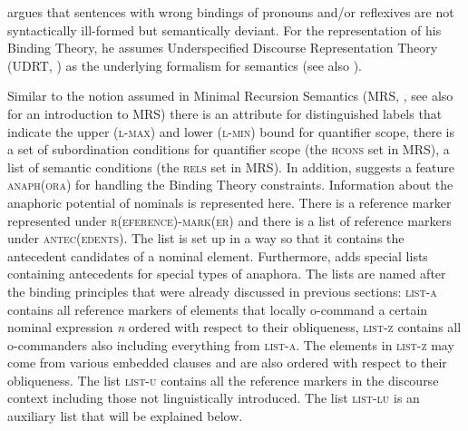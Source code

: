 \documentclass[output=paper
 	        ,biblatex
                ,babelshorthands
                ,newtxmath
                ,draftmode
                ,colorlinks, citecolor=brown
]{langscibook}
\begin{document}
\citet{Branco2002a} argues that sentences with wrong bindings of pronouns and/or reflexives are not
syntactically ill-formed but semantically deviant. For the representation of his Binding Theory, he
assumes Underspecified Discourse Representation Theory (UDRT, \citealp{Reyle93b-u,FR95a-u}) as the
underlying formalism for semantics (see also
). 

Similar to the notion assumed in Minimal Recursion Semantics (MRS, \citealp*{CFPS2005a}, see also  for an introduction to MRS) there is an
attribute for distinguished labels that indicate the upper (\textsc{l-max}) and lower
(\textsc{l-min}) bound for quantifier scope, there is a set of subordination conditions for
quantifier scope (the \textsc{hcons} set in MRS), a list of semantic conditions (the \textsc{rels}
set in MRS). In addition, \citeauthor{Branco2002a} suggests a feature \textsc{anaph(ora)} for handling
the Binding Theory constraints. Information about the anaphoric potential of nominals is represented
here. There is a reference marker represented under \textsc{r(eference)-mark(er)} and there is a list
of reference markers under \textsc{antec(edents)}. The list is set up in a way so that it contains
the antecedent candidates of a nominal element. Furthermore, \citeauthor{Branco2002a} adds special
lists containing antecedents for special types of anaphora. The lists are named after the binding
principles that were already discussed in previous sections: \textsc{list-a} contains all reference
markers of elements that locally o-command a certain nominal expression \emph{n} ordered with
respect to their obliqueness, \textsc{list-z} contains all o-commanders also including everything
from \textsc{list-a}. The elements in \textsc{list-z} may come from various
embedded clauses and are also ordered with respect to their obliqueness. The list \textsc{list-u}
contains all the reference markers in the discourse context including those not linguistically
introduced. The list \textsc{list-lu} is an auxiliary list that will be explained below.
\ea
{}
\z
\end{document}
